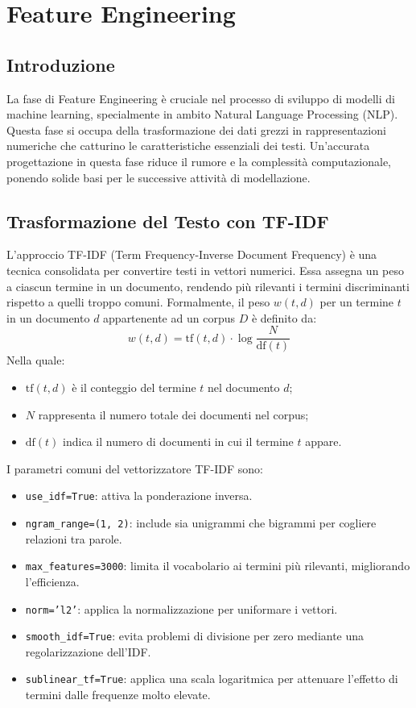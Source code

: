 \chapter{Feature Engineering}

\section{Introduzione}
La fase di Feature Engineering è cruciale nel processo di sviluppo di modelli di machine learning, specialmente in ambito Natural Language Processing (NLP). Questa fase si occupa della trasformazione dei dati grezzi in rappresentazioni numeriche che catturino le caratteristiche essenziali dei testi. Un’accurata progettazione in questa fase riduce il rumore e la complessità computazionale, ponendo solide basi per le successive attività di modellazione.

\section{Trasformazione del Testo con TF-IDF}
L'approccio TF-IDF (Term Frequency-Inverse Document Frequency) è una tecnica consolidata per convertire testi in vettori numerici. Essa assegna un peso a ciascun termine in un documento, rendendo più rilevanti i termini discriminanti rispetto a quelli troppo comuni.
Formalmente, il peso \(w(t,d)\) per un termine \(t\) in un documento \(d\) appartenente ad un corpus \(D\) è definito da:
\[
w(t,d) = \text{tf}(t,d) \cdot \log \frac{N}{\text{df}(t)}
\]
Nella quale:
\begin{itemize}
    \item \(\text{tf}(t,d)\) è il conteggio del termine \(t\) nel documento \(d\);
    \item \(N\) rappresenta il numero totale dei documenti nel corpus;
    \item \(\text{df}(t)\) indica il numero di documenti in cui il termine \(t\) appare.
\end{itemize}

I parametri comuni del vettorizzatore TF-IDF sono:
\begin{itemize}
    \item \texttt{use\_idf=True}: attiva la ponderazione inversa.
    \item \texttt{ngram\_range=(1, 2)}: include sia unigrammi che bigrammi per cogliere relazioni tra parole.
    \item \texttt{max\_features=3000}: limita il vocabolario ai termini più rilevanti, migliorando l'efficienza.
    \item \texttt{norm='l2'}: applica la normalizzazione per uniformare i vettori.
    \item \texttt{smooth\_idf=True}: evita problemi di divisione per zero mediante una regolarizzazione dell’IDF.
    \item \texttt{sublinear\_tf=True}: applica una scala logaritmica per attenuare l’effetto di termini dalle frequenze molto elevate.
\end{itemize}

